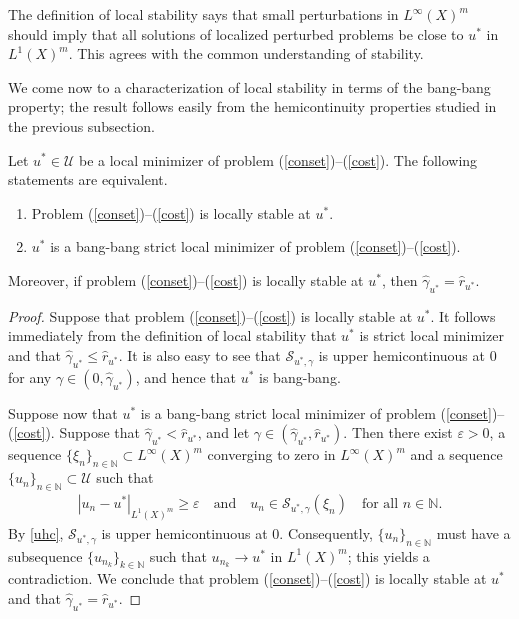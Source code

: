 \documentclass[hidelinks,onefignum,onetabnum]{siamart220329}
\begin{document}
The definition of local stability says that small perturbations in $L^\infty(X)^m$ should imply that all  solutions of localized perturbed  problems  be close to $u^*$ in $L^1(X)^m$. This agrees with the common understanding of stability.



We come now to a characterization of local stability in terms of the bang-bang property; the result follows  easily from the  hemicontinuity properties studied in the  previous subsection.




\begin{theorem}\label{lclystable}
	Let $u^*\in\mathcal U$ be a  local minimizer of problem (\ref{conset})--(\ref{cost}). The following statements are equivalent.
	\begin{enumerate}
		\item Problem (\ref{conset})--(\ref{cost}) is  locally stable at $u^*$.
		
		\item $u^*$ is a bang-bang strict local minimizer of problem (\ref{conset})--(\ref{cost}).
	\end{enumerate}
	Moreover, if  problem (\ref{conset})--(\ref{cost}) is  locally stable at $u^*$, then  $\hat\gamma_{u^*}=\hat r_{u^*}$. 
\end{theorem}
\begin{proof}
	Suppose that problem (\ref{conset})--(\ref{cost}) is locally stable at $u^*$. It follows immediately from the  definition of local stability that $u^*$ is strict local minimizer and that $\hat\gamma_{u^*}\le \hat r_{u^*}$.  It is also easy to see that $\mathcal S_{u^*,\gamma}$ is upper hemicontinuous at $0$ for any $\gamma\in(0,\hat\gamma_{u^*})$, and hence that $u^*$ is bang-bang. 
	
	Suppose now that $u^*$ is a bang-bang strict local minimizer of problem (\ref{conset})--(\ref{cost}).  Suppose that $\hat \gamma_{u^*}<\hat r_{u^*}$, and let $\gamma\in(\hat\gamma_{u^*},\hat r_{u^*})$. Then there exist $\varepsilon>0$, a sequence  $\{\xi_{n}\}_{n\in\mathbb N}\subset L^\infty(X)^m$ converging to zero in $L^\infty(X)^m$ and a sequence  $\{u_{n}\}_{n\in\mathbb N}\subset\mathcal U$ such that 
	\begin{align*}
		 |u_n-u^*|_{L^1(X)^m} \ge\varepsilon\quad\text{and}\quad u_n\in\mathcal S_{u^*,\gamma}(\xi_n)\quad\text{for all $n\in\mathbb N$.}
	\end{align*}
	 By \cref{uhc}, $\mathcal S_{u^*,\gamma}$ is upper hemicontinuous at $0$. Consequently, $\{u_{n}\}_{n\in\mathbb N}$ must have a subsequence $\{u_{n_k}\}_{k\in\mathbb N}$ such that $u_{n_k}\to u^*$ in $L^1(X)^m$; this yields a contradiction. We conclude that problem (\ref{conset})--(\ref{cost}) is locally stable at $u^*$ and that $\hat\gamma_{u^*}=\hat r_{u^*}$. 
\end{proof}
\end{document}
